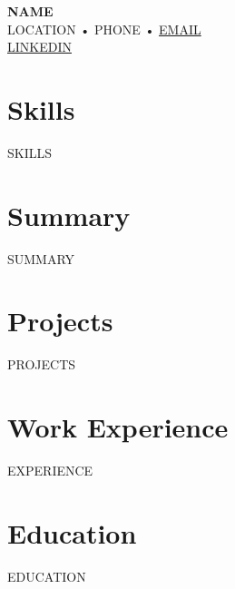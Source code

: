 \documentclass[11pt]{article}
\begin{document}
\noindent
\textbf{\LARGE {{NAME}}} \\
{{LOCATION}} • {{PHONE}} • \href{mailto:{{EMAIL}}}{{EMAIL}} \\
\href{{{LINKEDIN}}}{{LINKEDIN}}

\section*{Skills}
{{SKILLS}}

\section*{Summary}
{{SUMMARY}}

\section*{Projects}
{{PROJECTS}}

\section*{Work Experience}
{{EXPERIENCE}}

\section*{Education}
{{EDUCATION}}
\end{document}
